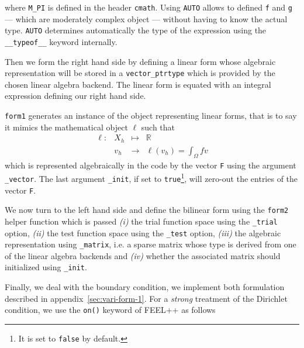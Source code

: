 

\noindent where \lstinline!M_PI! is defined in the header
\lstinline!cmath!.  Using \lstinline!AUTO! allows to defined
\lstinline!f!  and \lstinline!g! --- which are moderately complex
object --- without having to know the actual type. \lstinline!AUTO!
determines automatically the type of the expression using the
\lstinline!__typeof__! keyword internally.

Then we form the right hand side by defining a linear form whose
algebraic representation will be stored in a
\lstinline!vector_ptrtype! which is provided by the chosen linear
algebra backend. The linear form is equated with an integral
expression defining our right hand side.



\noindent \lstinline!form1! generates an instance of the object
representing linear forms, that is to say it mimics the mathematical
object $\ell$ such that
\begin{equation}
  \label{eq:9}
  \begin{array}{rccl}
    \ell: & X_h & \mapsto & \mathbb{R}\\
    & v_h & \rightarrow &\ell(v_h)=\int_\Omega f v
  \end{array}
\end{equation}
which is represented algebraically in the code by the vector
\lstinline!F! using the argument \lstinline!_vector!. The last
argument \lstinline!_init!, if set to \lstinline!true!\footnote{It is
  set to \lstinline!false! by default.}, will zero-out the entries of
the vector \lstinline!F!.


We now turn to the left hand side and define the bilinear form using
the \lstinline!form2! helper function which is passed \textit{(i)} the
trial function space using the \lstinline!_trial! option,
\textit{(ii)} the test function space using the \lstinline!_test!
option, \textit{(iii)} the algebraic representation using
\lstinline!_matrix!, i.e. a sparse matrix whose type is derived from
one of the linear algebra backends and \textit{(iv)} whether the
associated matrix should initialized using
\lstinline!_init!.





Finally, we deal with the boundary condition, we implement both
formulation described in appendix~\ref{sec:vari-form-1}. For a
\emph{strong} treatment of the Dirichlet condition, we use the
\lstinline!on()! keyword of FEEL++ as follows

